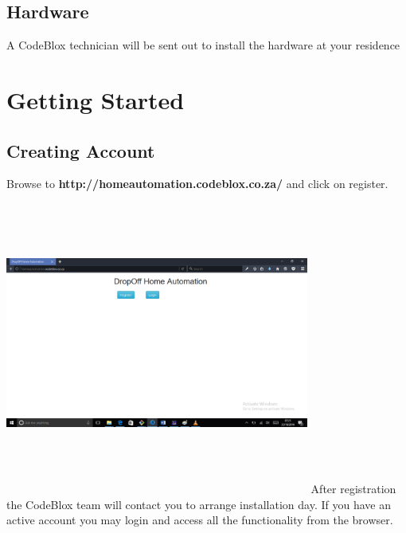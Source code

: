 \documentclass[a4paper,12pt]{article}
\begin{document}
		\subsection{Hardware}
		A CodeBlox technician will be sent out to install the hardware at your residence 
	\section{Getting Started}
		\subsection{Creating Account}
		Browse to \textbf{http://homeautomation.codeblox.co.za/} and click on register. \newline\newline 
		\includegraphics[width=10cm,height=10cm,keepaspectratio]{./Pictures/register.png}\newline
		After registration the CodeBlox team will contact you to arrange installation day.\newline\newline
		If you have an active account you may login and access all the functionality from the browser.
			
\end{document}
